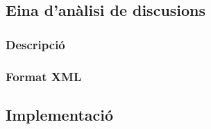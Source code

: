 
\subsection{Eina d'anàlisi de discusions}
\subsubsection{Descripció}
\subsubsection{Format XML}
\subsection{Implementació}
